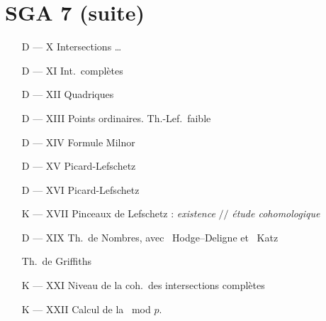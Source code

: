 \documentclass[11pt,a4paper]{article}
\begin{document}







\section*{SGA 7 (suite)}

\begin{itemize}
\item[D --- X] Intersections …

\item[D --- XI] Int.\ complètes

\item[D --- XII] Quadriques

\item[D --- XIII] Points  ordinaires. Th.-Lef.\ faible

\item[D --- XIV] Formule Milnor

\item[D --- XV] Picard-Lefschetz

\item[D --- XVI] Picard-Lefschetz

\item[K --- XVII] Pinceaux de Lefschetz : \emph{existence} $/\!/$
\emph{étude cohomologique}

\item[D --- \struck{XVIII} XIX] Th.\ de Nombres, avec \ill\ Hodge--Deligne et
\ill\ Katz

\item[\struck{XX}] Th.\ de Griffiths

\item[K --- XXI] \struck{\ill} Niveau de la coh.\ des intersections complètes

\item[K --- XXII] \struck{\ill} Calcul de la \ill\ mod $p$.
\end{itemize}
\end{document}
